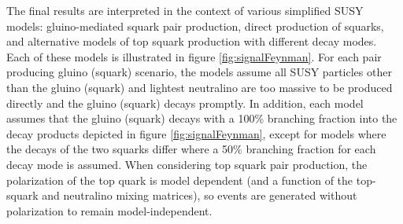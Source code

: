 The final results are interpreted in the context of various simplified SUSY models: gluino-mediated squark pair production, direct production of squarks, and alternative models of top squark production with different decay modes. Each of these models is illustrated in figure \ref{fig:signalFeynman}. For each pair producing gluino (squark) scenario, the models assume all SUSY particles other than the gluino (squark) and lightest neutralino are too massive to be produced directly and the gluino (squark) decays promptly. In addition, each model assumes that the gluino (squark) decays with a 100\% branching fraction into the decay products depicted in figure \ref{fig:signalFeynman}, except for models where the decays of the two squarks differ where a 50\% branching fraction for each decay mode is assumed. When considering top squark pair production, the polarization of the top quark is model dependent (and a function of the top-squark and neutralino mixing matrices), so events are generated without polarization to remain model-independent.

